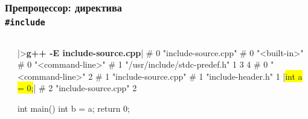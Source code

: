 \documentclass[compress]{beamer}
\newcommand{\shellprompt}{>}
\newcommand{\shellcommand}[1]{\shellprompt \space \textbf{#1}}
\begin{document}
\begin{frame}[fragile]

    \frametitle{Препроцессор: директива \\ \texttt{\#include}}

    \begin{columns}[T]

        \begin{column}{0.5\textwidth}



        \end{column}

        \begin{column}{0.5\textwidth}

            \begin{ConsoleWindow}
|\shellcommand{g++ -E include-source.cpp}|
# 0 "include-source.cpp"
# 0 "<built-in>"
# 0 "<command-line>"
# 1 "/usr/include/stdc-predef.h" 1 3 4
# 0 "<command-line>" 2
# 1 "include-source.cpp"
# 1 "include-header.h" 1
|\colorbox{yellow}{int a = 0;}|
# 2 "include-source.cpp" 2

int main() {
    int b = a;
    return 0;
}
            \end{ConsoleWindow}

        \end{column}

    \end{columns}

\end{frame}
\end{document}
